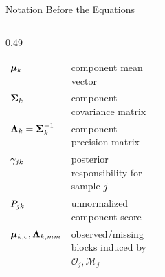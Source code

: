 \begin{frame}[shrink=6]{Notation Before the Equations}
\begin{columns}[T,onlytextwidth]
\begin{column}{0.49\textwidth}
\begin{tabularx}{\linewidth}{@{}>{\raggedright\arraybackslash}p{0.26\linewidth}X@{}}
                \(\bm{\mu}_k\) & component mean vector \\
                \(\mathbf{\Sigma}_k\) & component covariance matrix \\
                \(\mathbf{\Lambda}_k=\mathbf{\Sigma}_k^{-1}\) & component precision matrix \\
                \(\gamma_{jk}\) & posterior responsibility for sample \(j\) \\
                \(P_{jk}\) & unnormalized component score \\
                \(\bm{\mu}_{k,o},\mathbf{\Lambda}_{k,mm}\) & observed/missing blocks induced by \(\mathcal{O}_j,\mathcal{M}_j\)
            \end{tabularx}
        \end{column}
    \end{columns}
\end{frame}

